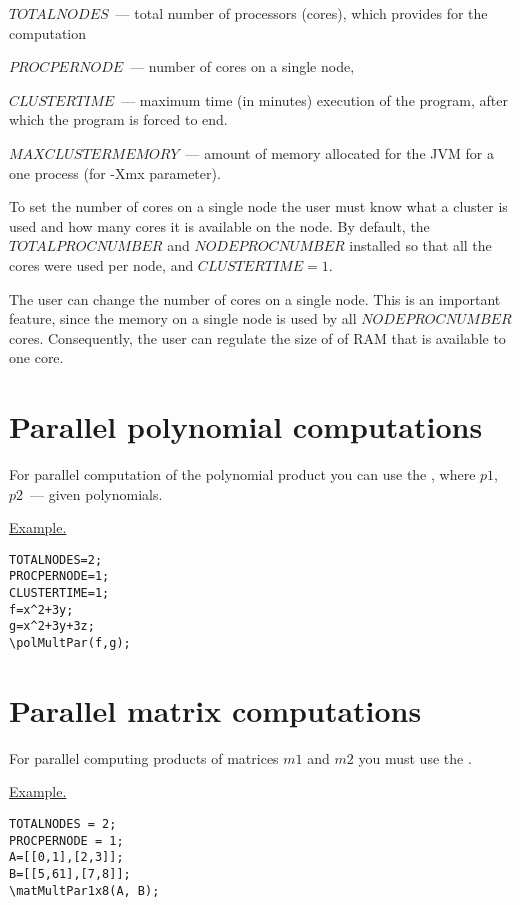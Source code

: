 $ TOTALNODES $~--- total number of processors (cores), which provides for the computation

$ PROCPERNODE $~--- number of cores on a single node,

$ CLUSTERTIME $~--- maximum time (in minutes) execution of the program, after which the program is forced to end. 

$MAXCLUSTERMEMORY$~--- amount of memory allocated for the JVM for a one  process (for -Xmx parameter).

To set the number of cores on a single node the user must know what a cluster is used and how many cores it is available on the node. By default, the $ TOTALPROCNUMBER $ and $ NODEPROCNUMBER $ installed so that all the cores were used per node, and $ CLUSTERTIME = 1 $.

The user can change the number of cores on a single node. This is an important feature, since the memory on a single node is used by all $ NODEPROCNUMBER $ cores. Consequently, the user can regulate the size of of RAM that is available to one core.

\section{Parallel polynomial computations}
   For parallel computation  of the  polynomial product you can use the 
   , where $ p1 $, $ p2 $~--- given polynomials.

\underline{Example. }
\begin{verbatim}
TOTALNODES=2; 
PROCPERNODE=1;
CLUSTERTIME=1; 
f=x^2+3y;
g=x^2+3y+3z;
\polMultPar(f,g);
\end{verbatim}

      
\section{Parallel matrix computations}
  For parallel computing  products of matrices $ m1 $ and $ m2 $   you must use the 
  . 
 
  \underline{Example. }
\begin{verbatim}
TOTALNODES = 2;
PROCPERNODE = 1;
A=[[0,1],[2,3]];
B=[[5,61],[7,8]];
\matMultPar1x8(A, B);
\end{verbatim}


